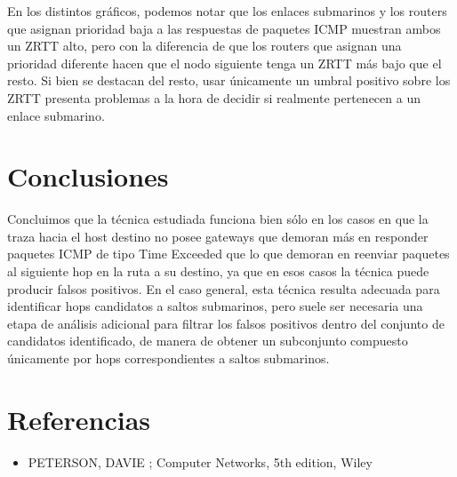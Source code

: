 \documentclass[10pt, a4paper]{article}
\begin{document}
En los distintos gráficos, podemos notar que los enlaces submarinos y los routers que asignan prioridad baja a las respuestas de paquetes ICMP muestran ambos un ZRTT alto, pero con la diferencia de que los routers que asignan una prioridad diferente hacen que el nodo siguiente tenga un ZRTT más bajo que el resto. Si bien se destacan del resto, usar únicamente un umbral positivo sobre los ZRTT presenta problemas a la hora de decidir si realmente pertenecen a un enlace submarino.

\section{Conclusiones}

Concluimos que la técnica estudiada funciona bien sólo en los casos en que la traza hacia el host destino no posee gateways que demoran más en responder paquetes ICMP de tipo Time Exceeded que lo que demoran en reenviar paquetes al siguiente hop en la ruta a su destino, ya que en esos casos la técnica puede producir falsos positivos.
En el caso general, esta técnica resulta adecuada para identificar hops candidatos a saltos submarinos, pero suele ser necesaria una etapa de análisis adicional para filtrar los falsos positivos dentro del conjunto de candidatos identificado, de manera de obtener un subconjunto compuesto únicamente por hops correspondientes a saltos submarinos.

\section{Referencias}
\begin{itemize}
\item PETERSON, DAVIE ; Computer Networks, 5th edition, Wiley


\end{itemize}
\end{document}
